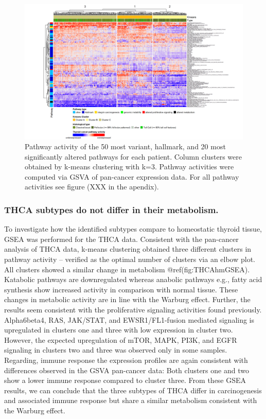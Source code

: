 \documentclass[
]{article}
\begin{document}
\begin{figure}

{\centering \includegraphics[width=1\linewidth]{figures/THCA Heatmap from Pancancer data top 50 pathways} 

}

\caption{Pathway activity of the 50 most variant, hallmark, and 20 most significantly altered pathways for each patient. Column clusters were obtained by k-means clustering with k=3. Pathway activities were computed via GSVA of pan-cancer expression data. For all pathway activities see figure (XXX in the apendix).}\label{fig:THCAhm}
\end{figure}

\hypertarget{thca-subtypes-do-not-differ-in-their-metabolism.}{%
\subsubsection{THCA subtypes do not differ in their
metabolism.}\label{thca-subtypes-do-not-differ-in-their-metabolism.}}

To investigate how the identified subtypes compare to homeostatic
thyroid tissue, GSEA was performed for the THCA data. Consistent with
the pan-cancer analysis of THCA data, k-means clustering obtained three
different clusters in pathway activity -- verified as the optimal number
of clusters via an elbow plot. All clusters showed a similar change in
metabolism @ref(fig:THCAhmGSEA). Katabolic pathways are downregulated
whereas anabolic pathways e.g., fatty acid synthesis show increased
activity in comparison with normal tissue. These changes in metabolic
activity are in line with the Warburg effect. Further, the results seem
consistent with the proliferative signaling activities found previously.
Alpha6beta4, RAS, JAK/STAT, and EWSR1/FL1-fusion mediated signaling is
upregulated in clusters one and three with low expression in cluster
two. However, the expected upregulation of mTOR, MAPK, PI3K, and EGFR
signaling in clusters two and three was observed only in some samples.
Regarding, immune response the expression profiles are again consistent
with differences observed in the GSVA pan-cancer data: Both clusters one
and two show a lower immune response compared to cluster three. From
these GSEA results, we can conclude that the three subtypes of THCA
differ in carcinogenesis and associated immune response but share a
similar metabolism consistent with the Warburg effect.
\end{document}
